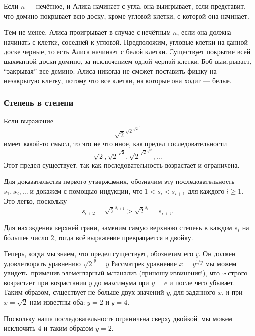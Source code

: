 Если $n$ --- нечётное, и Алиса начинает с угла, она выигрывает,  если представит, что домино покрывает всю доску, кроме угловой клетки, с которой она начинает.


Tем не менее, Алиса проигрывает в случае с нечётным $n$, если она должна начинать с клетки, соседней к угловой.  Предположим, угловые клетки на данной доске черные, то есть Алиса начинает  с белой клетки. 
Существует покрытие всей шахматной доски домино, за исключением одной черной клетки. Боб выигрывает, “закрывая” все домино. Алиса
никогда не сможет поставить фишку на незакрытую клетку, потому что все клетки, на которые она ходит ---  белые.\heart






\subsubsection*{Степень в степени} %



Если выражение
$${\sqrt{2}}^{{\sqrt{2}}^{{\sqrt{2}}^{{\cdot}^{\cdot^{\cdot}}}}}$$
имеет какой-то смысл, то это не что иное, как предел последовательности
$${\sqrt{2}}, {\sqrt{2}}^{{\sqrt{2}}}, {\sqrt{2}}^{{\sqrt{2}}^{{\sqrt{2}}}},\dots$$
Этот предел существует, так как последовательность возрастает и ограничена.


Для доказательства первого утверждения, обозначим эту последовательность
$s_1, s_2,\dots$ и докажем с помощью индукции, что $1<s_i<s_{i+1}$
для каждого $i\ge 1$.  
Это легко, поскольку \[s_{i+2}=
{\sqrt{2}}^{s_{i+1}}
>{\sqrt{2}}^{s_{i}}
=s_{i+1}.\]

Для нахождения верхней грани, заменим самую верхнюю степень в каждом $s_i$  на б\'{о}льшее число $2$, тогда всё выражение превращается в двойку.


Теперь, когда мы знаем, что предел существует, обозначим его $y$.
Он должен удовлетворять уравнению
${\sqrt{2}}^y=y$
Рассматрев уравнение $x=y^{1/y}$  
мы можем увидеть, применив элементарный матанализ  (приношу  извинения!), 
что $x$ строго возрастает при возрастании $y$ до максимума при $y=e$
и после чего убывает. 
Таким образом, существует не больше двух значений $y$, для заданного $x$, 
и при $x=\sqrt{2}$ нам известны оба: $y=2$ и $y=4$.

Поскольку наша последовательность ограничена сверху двойкой, мы можем исключить $4$ и таким образом $y=2$.\heart


